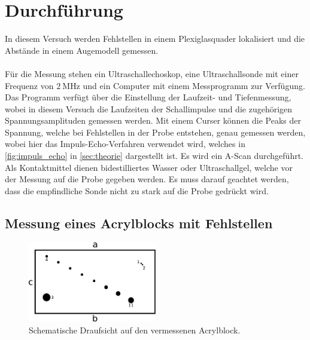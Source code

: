 \section{Durchführung}

    In diesem Versuch werden Fehlstellen in einem Plexiglasquader lokalisiert
    und die Abstände in einem Augemodell gemessen.\\
    \\
    Für die Messung stehen ein Ultraschallechoskop,
    eine Ultraschallsonde mit einer Frequenz von $\SI{2}{\mega\hertz}$ und ein Computer mit einem Messprogramm zur Verfügung.
    Das Programm verfügt über die Einstellung der Laufzeit- und Tiefenmessung,
    wobei in diesem Versuch die Laufzeiten der Schallimpulse und die zugehörigen Spannungsamplituden gemessen werden.
    Mit einem Curser können die Peaks der Spannung,
    welche bei Fehlstellen in der Probe entstehen,
    genau gemessen werden,
    wobei hier das Impuls-Echo-Verfahren verwendet wird,
    welches in \autoref{fig:impuls_echo} in \autoref{sec:theorie} dargestellt ist.
    Es wird ein A-Scan durchgeführt.
    Als Kontaktmittel dienen bidestilliertes Wasser oder Ultraschallgel,
    welche vor der Messung auf die Probe gegeben werden.
    Es muss darauf geachtet werden,
    dass die empfindliche Sonde nicht zu stark auf die Probe gedrückt wird.

\subsection{Messung eines Acrylblocks mit Fehlstellen}

    \begin{figure}[H]
        \centering
        \includegraphics[width=0.5\textwidth]{content/img/Acrylblock.pdf}
        \caption{Schematische Draufsicht auf den vermessenen Acrylblock.}
        \label{fig:acrylblock}
    \end{figure}

